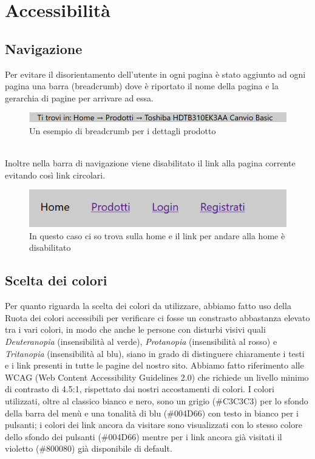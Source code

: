\section{Accessibilità}
\subsection{Navigazione}
Per evitare il disorientamento dell'utente in ogni pagina è stato aggiunto ad ogni pagina una barra (breadcrumb) dove è riportato il nome della pagina e la gerarchia di pagine per arrivare ad essa.\newline 
\begin{figure}[!h]
	\label{bc} 
	\centering %
	\includegraphics[width=1\textwidth]{immagini/bc.png}
	\caption{Un esempio di breadcrumb per i dettagli prodotto} %
\end{figure} \mbox{} \\
Inoltre nella barra di navigazione viene disabilitato  il link alla pagina corrente evitando così link circolari.
\begin{figure}[h]
	\label{navbar} 
	\centering %
	\includegraphics[width=1\textwidth]{immagini/navbar.png}
	\caption{In questo caso ci so trova sulla home e il link per andare alla home è disabilitato} %
\end{figure}

\subsection{Scelta dei colori}
Per quanto riguarda la scelta dei colori da utilizzare, abbiamo fatto uso della Ruota dei colori accessibili per verificare ci fosse un constrasto abbastanza elevato tra i vari colori, in modo che anche le persone con disturbi visivi quali \emph{Deuteranopia} (insensibilità al verde), \emph{Protanopia} (insensibilità al rosso) e \emph{Tritanopia} (insensibilità al blu), siano in grado di distinguere chiaramente i testi e i link presenti in tutte le pagine del nostro sito.\newline
Abbiamo fatto riferimento alle WCAG (Web Content Accessibility Guidelines 2.0) che richiede un livello minimo di contrasto di 4.5:1, rispettato dai nostri accostamenti di colori.\newline
I colori utilizzati, oltre al classico bianco e nero, sono un grigio (\#C3C3C3) per lo sfondo della barra del menù e una tonalità di blu (\#004D66) con testo in bianco per i pulsanti; i colori dei link ancora da visitare sono visualizzati con lo stesso colore dello sfondo dei pulsanti (\#004D66) mentre per i link ancora già visitati il violetto (\#800080) già disponibile di default.